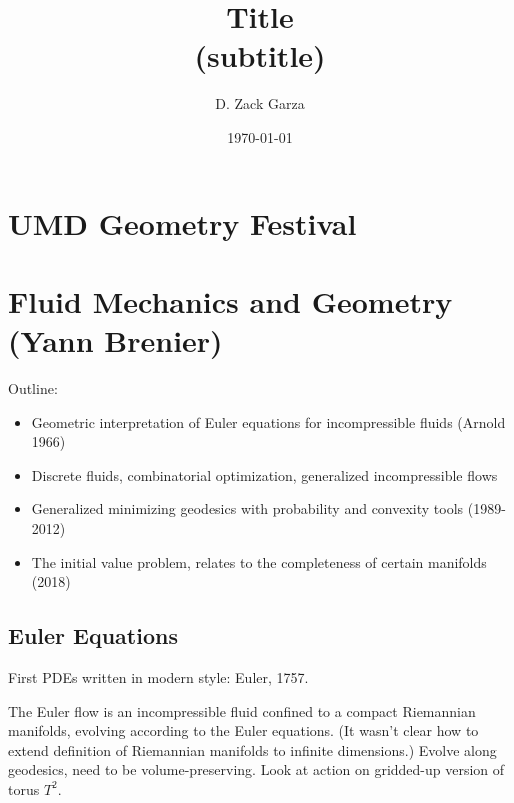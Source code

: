 

\title{
	\textbf{Title}\\
	{\normalsize (subtitle)}
}
\author{D. Zack Garza}
\date{\today}



\maketitle{}
\tableofcontents


\hypertarget{umd-geometry-festival}{%
\section{UMD Geometry Festival}\label{umd-geometry-festival}}

\hypertarget{fluid-mechanics-and-geometry-yann-brenier}{%
\section{Fluid Mechanics and Geometry (Yann
Brenier)}\label{fluid-mechanics-and-geometry-yann-brenier}}

Outline:

\begin{itemize}
\tightlist
\item
  Geometric interpretation of Euler equations for incompressible fluids
  (Arnold 1966)
\item
  Discrete fluids, combinatorial optimization, generalized
  incompressible flows
\item
  Generalized minimizing geodesics with probability and convexity tools
  (1989-2012)
\item
  The initial value problem, relates to the completeness of certain
  manifolds (2018)
\end{itemize}

\hypertarget{euler-equations}{%
\subsection{Euler Equations}\label{euler-equations}}

First PDEs written in modern style: Euler, 1757.

The Euler flow is an incompressible fluid confined to a compact
Riemannian manifolds, evolving according to the Euler equations. (It
wasn't clear how to extend definition of Riemannian manifolds to
infinite dimensions.) Evolve along geodesics, need to be
volume-preserving. Look at action on gridded-up version of torus
\(T^2\).

